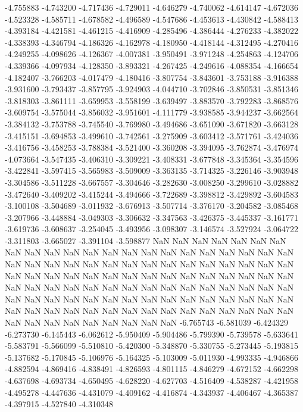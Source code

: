 -4.755883
-4.743200
-4.717436
-4.729011
-4.646279
-4.740062
-4.614147
-4.672036
-4.523328
-4.585711
-4.678582
-4.496589
-4.547686
-4.453613
-4.430842
-4.588413
-4.393184
-4.421581
-4.461215
-4.416909
-4.285496
-4.386444
-4.276233
-4.382022
-4.338393
-4.346794
-4.186326
-4.162978
-4.180950
-4.418144
-4.312495
-4.270416
-4.249255
-4.098626
-4.126367
-4.007381
-3.950491
-3.971248
-4.254863
-4.124706
-4.339366
-4.097934
-4.128350
-3.893321
-4.267425
-4.249616
-4.088354
-4.166654
-4.182407
-3.766203
-4.017479
-4.180416
-3.807754
-3.843601
-3.753188
-3.916388
-3.931600
-3.793437
-3.857795
-3.924903
-4.044710
-3.702846
-3.850531
-3.851346
-3.818303
-3.861111
-3.659953
-3.558199
-3.639497
-3.883570
-3.792283
-3.868576
-3.609754
-3.575044
-3.856032
-3.951601
-4.111779
-3.938585
-3.944237
-3.662564
-3.384132
-3.753788
-3.745540
-3.769980
-3.494686
-3.651090
-3.671820
-3.663128
-3.415151
-3.694853
-3.499610
-3.742561
-3.275909
-3.603412
-3.571761
-3.424036
-3.416756
-3.458253
-3.788384
-3.521400
-3.360208
-3.394095
-3.762874
-3.476974
-4.073664
-3.547435
-3.406310
-3.309221
-3.408331
-3.677848
-3.345364
-3.354596
-3.422841
-3.597415
-3.565983
-3.509009
-3.363135
-3.714325
-3.226146
-3.903948
-3.304586
-3.511228
-3.667557
-3.304646
-3.282630
-3.008250
-3.299610
-3.028882
-3.472640
-3.409202
-3.415244
-3.494666
-3.722689
-3.398812
-3.429892
-3.604583
-3.100108
-3.504689
-3.011932
-3.676913
-3.507714
-3.376170
-3.204582
-3.085468
-3.207966
-3.448884
-3.049303
-3.306632
-3.347563
-3.426375
-3.445337
-3.161771
-3.619736
-3.608637
-3.254045
-3.493956
-3.098307
-3.146574
-3.527924
-3.064722
-3.311803
-3.665027
-3.391104
-3.598877
NaN
NaN
NaN
NaN
NaN
NaN
NaN
NaN
NaN
NaN
NaN
NaN
NaN
NaN
NaN
NaN
NaN
NaN
NaN
NaN
NaN
NaN
NaN
NaN
NaN
NaN
NaN
NaN
NaN
NaN
NaN
NaN
NaN
NaN
NaN
NaN
NaN
NaN
NaN
NaN
NaN
NaN
NaN
NaN
NaN
NaN
NaN
NaN
NaN
NaN
NaN
NaN
NaN
NaN
NaN
NaN
NaN
NaN
NaN
NaN
NaN
NaN
NaN
NaN
NaN
NaN
NaN
NaN
NaN
NaN
NaN
NaN
NaN
NaN
NaN
NaN
NaN
NaN
NaN
NaN
NaN
NaN
NaN
NaN
NaN
NaN
NaN
NaN
NaN
NaN
NaN
NaN
NaN
NaN
NaN
NaN
NaN
NaN
NaN
NaN
NaN
NaN
NaN
NaN
NaN
NaN
-6.765743
-6.581039
-6.424329
-6.273730
-6.145443
-6.062612
-5.950409
-5.904486
-5.799390
-5.739578
-5.633641
-5.583791
-5.566099
-5.510810
-5.420300
-5.348870
-5.330755
-5.273445
-5.193815
-5.137682
-5.170845
-5.106976
-5.164325
-5.103009
-5.011930
-4.993335
-4.946866
-4.882594
-4.869416
-4.838491
-4.826593
-4.801115
-4.846279
-4.672152
-4.662298
-4.637698
-4.693734
-4.650495
-4.628220
-4.627703
-4.516409
-4.538287
-4.421958
-4.495278
-4.447636
-4.431079
-4.409162
-4.416874
-4.343937
-4.406467
-4.365387
-4.397915
-4.527840
-4.310348
